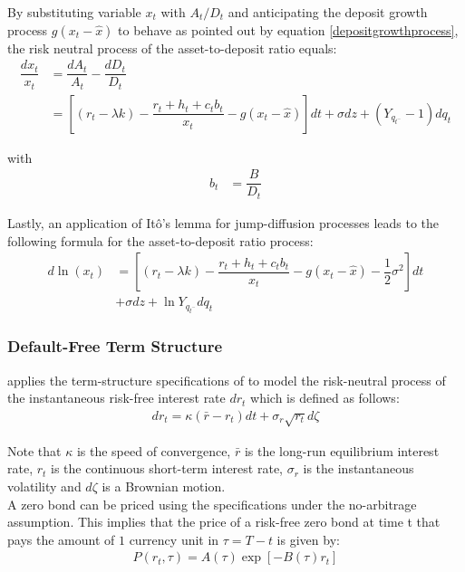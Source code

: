 By substituting variable $x_t$ with $A_t/D_t$ and anticipating the deposit growth process $g\left(x_t - \hat{x}\right)$ to behave as pointed out by equation \ref{depositgrowthprocess}, the risk neutral process of the asset-to-deposit ratio equals:
\begin{align}
\dfrac{dx_t}{x_t}&= \dfrac{dA_t}{A_t} - \dfrac{dD_t}{D_t}\\ \nonumber
&= \left[ \left(r_t - \lambda k \right) - \dfrac{r_t + h_t + c_t b_t}{x_t} - g\left(x_t - \hat{x}\right)\right] dt + \sigma dz + \left( Y_{q_{t^{-}}} - 1 \right) dq_t
\end{align}

with
\begin{align}
b_t &= \dfrac{B}{D_t}
\end{align}

Lastly, an application of It\^{o}'s lemma for jump-diffusion processes leads to the following formula for the asset-to-deposit ratio process:
\begin{align}
d \ln\left(x_t\right) &= \left[ \left( r_t - \lambda k \right) - \dfrac{r_t + h_t + c_t b_t}{x_t} - g\left( x_t - \hat{x} \right) - \dfrac{1}{2} \sigma^2 \right] dt \\ \nonumber
&+ \sigma dz + \ln Y_{q_{t^{-}}} dq_t
\end{align}

\subsubsection*{Default-Free Term Structure}
\label{termstructure}

\citet{pennacchi2010structural} applies the term-structure specifications of \citet{cox1985theory} to model the risk-neutral process of the instantaneous risk-free interest rate $dr_t$ which is defined as follows:
\begin{align}
dr_t = \kappa \left(\bar{r} - r_t \right) dt + \sigma_r \sqrt{r_t} d \zeta
\end{align}

Note that $\kappa$ is the speed of convergence, $\bar{r}$ is the long-run equilibrium interest rate, $r_t$ is the continuous short-term interest rate, $\sigma_r$ is the instantaneous volatility and $d\zeta$ is a Brownian motion.\\

A zero bond can be priced using the \citet{cox1985theory} specifications under the no-arbitrage assumption. This implies that the price of a risk-free zero bond at time t that pays the amount of $1$ currency unit in $\tau = T - t$ is given by:
\begin{align} \label{zerobondprice}
P\left( r_t, \tau \right) = A\left(\tau \right) \exp\left[ - B\left( \tau \right) r_t \right]
\end{align}

